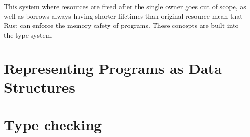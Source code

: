 This system where resources are freed after the single owner goes out of scope,
as well as borrows always having shorter lifetimes than original resource
mean that Rust can enforce the memory safety of programs. These concepts are
built into the type system.

\section{Representing Programs as Data Structures}

\section{Type checking}
